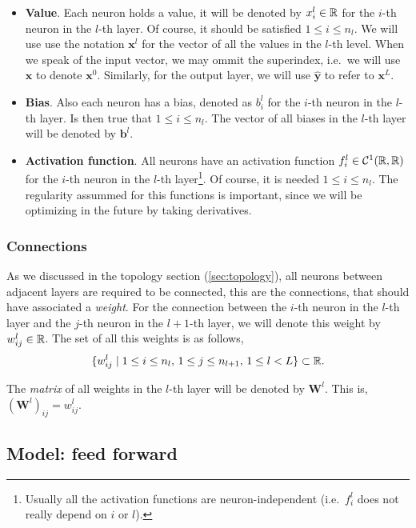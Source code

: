 \begin{itemize}
  \item \textbf{Value}. Each neuron holds a value, it will be denoted by
  \(x_i^l \in \mathbb{R}\) for the \(i\)-th neuron in the \(l\)-th layer. Of course, it
  should be satisfied \(1 \leq i \leq n_l\). We will use use the notation
  \(\mathbf{x}^l\) for the vector of all the values in the \(l\)-th level. When
  we speak of the input vector, we may ommit the superindex, i.e.\ we will use
  \(\mathbf{x}\) to denote \(\mathbf{x}^0\). Similarly, for the output layer,
  we will use \(\mathbf{\hat{y}}\) to refer to \(\mathbf{x}^L\).
  \item \textbf{Bias}. Also each neuron has a bias, denoted as \(b_i^l\) for
  the \(i\)-th neuron in the \(l\)-th layer. Is then true that
  \(1 \leq i \leq n_l\). The vector of all biases in the \(l\)-th layer will be
  denoted by \(\mathbf{b}^l\).
  \item \textbf{Activation function}. All neurons have an activation function
  \(f_i^l \in \mathcal{C}^1(\mathbb{R}, \mathbb{R})\) for the \(i\)-th neuron in the \(l\)-th
  layer\footnote{Usually all the activation functions are neuron-independent
    (i.e.\ \(f_i^l\) does not really depend on \(i\) or \(l\)).}. Of course, it
  is needed \(1 \leq i \leq n_l\). The regularity assummed for this functions
  is important, since we will be optimizing in the future by taking
  derivatives.
\end{itemize}

\subsubsection{Connections}
As we discussed in the topology section (\ref{sec:topology}), all neurons
between adjacent layers are required to be connected, this are the connections,
that should have associated a \emph{weight}. For the connection between the
\(i\)-th neuron in the \(l\)-th layer and the \(j\)-th neuron in the
\(l + 1\)-th layer, we will denote this weight by \(w_{ij}^l \in \mathbb{R}\). The set of
all this weights is as follows,
\begin{equation}
   \{w_{ij}^l \mid 1 \leq i \leq n_{l}, \, 1 \leq j \leq n_{l+1}, \, 1 \leq l <
   L \} \subset \mathbb{R}.
 \end{equation}

The \emph{matrix} of all weights in the \(l\)-th layer will be denoted by
\(\mathbf{W}^l\). This is, \((\mathbf{W}^l)_{ij} = w_{ij}^l\).

\subsection{Model: feed forward}
\label{subsec:forward}

